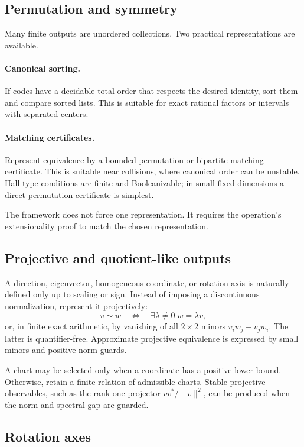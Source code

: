 \subsection{Permutation and symmetry}

Many finite outputs are unordered collections.  Two practical representations are available.

\paragraph{Canonical sorting.}
If codes have a decidable total order that respects the desired identity, sort them and compare sorted lists.  This is suitable for exact rational factors or intervals with separated centers.

\paragraph{Matching certificates.}
Represent equivalence by a bounded permutation or bipartite matching certificate.  This is suitable near collisions, where canonical order can be unstable.  Hall-type conditions are finite and Booleanizable; in small fixed dimensions a direct permutation certificate is simplest.

The framework does not force one representation.  It requires the operation's extensionality proof to match the chosen representation.

\subsection{Projective and quotient-like outputs}

A direction, eigenvector, homogeneous coordinate, or rotation axis is naturally defined only up to scaling or sign.  Instead of imposing a discontinuous normalization, represent it projectively:
\[
 v\sim w\quad\Longleftrightarrow\quad
 \exists \lambda\ne0\; w=\lambda v,
\]
or, in finite exact arithmetic, by vanishing of all \(2\times2\) minors \(v_iw_j-v_jw_i\).  The latter is quantifier-free.  Approximate projective equivalence is expressed by small minors and positive norm guards.

A chart may be selected only when a coordinate has a positive lower bound.  Otherwise, retain a finite relation of admissible charts.  Stable projective observables, such as the rank-one projector \(vv^*/\|v\|^2\), can be produced when the norm and spectral gap are guarded.

\subsection{Rotation axes}


